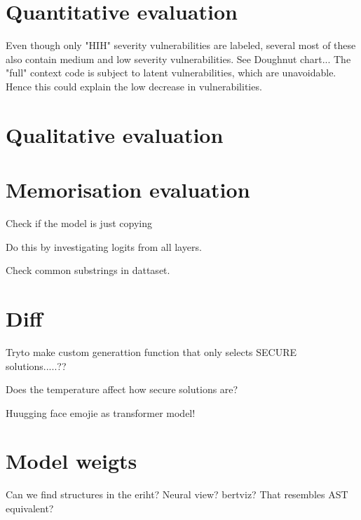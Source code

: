 \section{Quantitative evaluation}

Even though only "HIH" severity vulnerabilities are labeled, several most of these also contain medium and low severity vulnerabilities. See Doughnut chart...  
The "full" context code is subject to latent vulnerabilities, which are unavoidable. Hence this could explain the low decrease in vulnerabilities.




\section{Qualitative evaluation}


\section{Memorisation evaluation}
Check if the model is just copying

Do this by investigating logits from  all layers.

Check common substrings in dattaset.

\section{Diff}

Tryto make custom generattion function that only selects SECURE solutions.....??

Does the temperature affect how secure solutions are?


Huugging face emojie as transformer model!


\section{Model weigts}

Can  we  find structures in the eriht? Neural  view? bertviz? That resembles AST equivalent?

